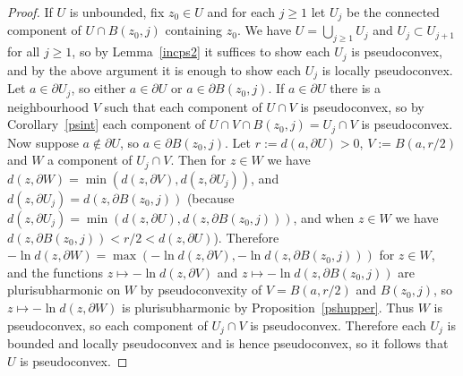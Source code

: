 \documentclass[11pt,a4paper, final, twoside]{article}
\numberwithin{equation}{section}
\newcommand{\bd}{\partial}
\newcommand{\ball}{B}
\newcommand{\emetric}{d}
\begin{document}
\begin{proof}
If $U$ is unbounded, fix $z_0\in U$ and for each $j\geq 1$ let $U_j$ be the connected component of $U\cap\ball(z_0,j)$ containing $z_0$. We have $U=\bigcup_{j\geq 1}U_j$ and $U_j\subset U_{j+1}$
for all $j\geq 1$, so by Lemma~\ref{incps2} it suffices to show each $U_j$ is pseudoconvex, and by the above argument it is enough
to show each $U_j$ is locally pseudoconvex. Let $a\in\bd U_j$, so either $a\in\bd U$ or $a\in\bd\ball(z_0,j)$.
If $a\in\bd U$ there is a neighbourhood $V$ such that each component of $U\cap V$ is pseudoconvex, so by Corollary~\ref{psint}
each component of $U\cap V\cap \ball(z_0,j)=U_j\cap V$ is pseudoconvex. Now suppose $a\not\in\bd U$, so $a\in\bd\ball(z_0,j)$. Let $r:=\emetric(a,\bd U)>0$,
$V:=\ball(a,r/2)$ and $W$ a component of $U_j\cap V$. Then for $z\in W$ we have $\emetric(z,\bd W)=\min(\emetric(z,\bd V),\emetric(z,\bd U_j))$, and 
$\emetric(z,\bd U_j)=\emetric(z,\bd\ball(z_0,j))$ (because $\emetric(z,\bd U_j)=\min(\emetric(z,\bd U),\emetric(z,\bd\ball(z_0,j)))$, and when $z\in W$
we have $\emetric(z,\bd\ball(z_0,j))<r/2<\emetric(z,\bd U)$). Therefore $-\ln\emetric(z,\bd W)=\max(-\ln\emetric(z,\bd V),-\ln\emetric(z,\bd \ball(z_0,j)))$ for $z\in W$,
and the functions $z\mapsto -\ln\emetric(z,\bd V)$ and $z\mapsto -\ln\emetric(z,\bd\ball(z_0,j))$ are plurisubharmonic on $W$ by pseudoconvexity of $V=\ball(a,r/2)$ and $\ball(z_0,j)$,
so $z\mapsto -\ln\emetric(z,\bd W)$ is plurisubharmonic by Proposition~\ref{pshupper}. Thus $W$ is pseudoconvex, so each component of $ U_j\cap V$ is pseudoconvex. Therefore
each $U_j$ is bounded and locally pseudoconvex and is hence pseudoconvex, so it follows
that $U$ is pseudoconvex. 
\end{proof}
\end{document}
